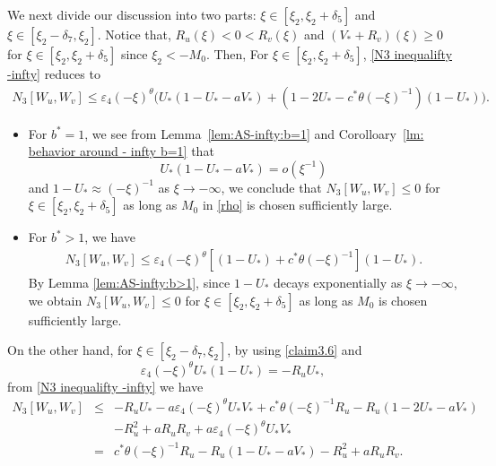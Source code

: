 \documentclass[11pt,a4paper]{article}
\numberwithin{equation}{section}
\numberwithin{figure}{section}
\newcommand\beaa{\begin{eqnarray*}}
\newcommand\eeaa{\end{eqnarray*}}
\begin{document}
We next divide our discussion into two parts: $\xi\in[\xi_2,\xi_2+\delta_5]$ and $\xi\in[\xi_2-\delta_7,\xi_2]$.
Notice that, $R_u(\xi)<0<R_v(\xi)$ and $(V_*+R_v)(\xi)\ge 0$ for $\xi\in[\xi_2,\xi_2+\delta_5]$ since $\xi_2<-M_0$.
Then, For $\xi\in[\xi_2,\xi_2+\delta_5]$,
\eqref{N3 inequalifty -infty} reduces to
\beaa
N_3[W_u,W_v]\leq \varepsilon_4(-\xi)^{\theta}\Big(U_*(1-U_*-aV_*)+(1-2U_*-c^*\theta(-\xi)^{-1})(1-U_*)\Big).
\eeaa
\begin{itemize}
    \item For $b^*=1$, we see from Lemma~\ref{lem:AS-infty:b=1} and Corolloary~\ref{lm: behavior around - infty b=1} that 
    $$U_*(1-U_*-aV_*)=o(\xi^{-1})$$
     and $1-U_*\approx (-\xi)^{-1}$ as $\xi\to-\infty$, we conclude that $N_3[W_u,W_v]\leq0$
for $\xi\in[\xi_2,\xi_2+\delta_5]$ as long as $M_0$ in \eqref{rho} is chosen sufficiently large.
     \item For $b^*>1$,
we have
\beaa
N_3[W_u,W_v]\leq \varepsilon_4(-\xi)^{\theta}[(1-U_*)+c^*\theta(-\xi)^{-1}](1-U_*).
\eeaa
By Lemma \ref{lem:AS-infty:b>1}, since $1-U_*$ decays exponentially as $\xi\to-\infty$, we obtain $N_3[W_u,W_v]\leq0$
for $\xi\in[\xi_2,\xi_2+\delta_5]$ as long as $M_0$ is chosen sufficiently large.
\end{itemize}







On the other hand, for $\xi\in[\xi_2-\delta_7,\xi_2]$, %
by using \eqref{claim3.6} and
$$\varepsilon_4(-\xi)^{\theta}U_*(1-U_*)=-R_uU_*,$$
from \eqref{N3 inequalifty -infty} we have
\beaa
N_3[W_u,W_v]&\le&-R_uU_*-a\varepsilon_4(-\xi)^{\theta}U_*V_*+c^*\theta(-\xi)^{-1}R_u-R_u(1-2U_*-aV_*)
\\
&&-R_u^2+aR_uR_v+a\varepsilon_4(-\xi)^{\theta}U_*V_*\\
&=&c^*\theta(-\xi)^{-1}R_u-R_u(1-U_*-aV_*)
-R_u^2+aR_uR_v.
\eeaa
\end{document}
